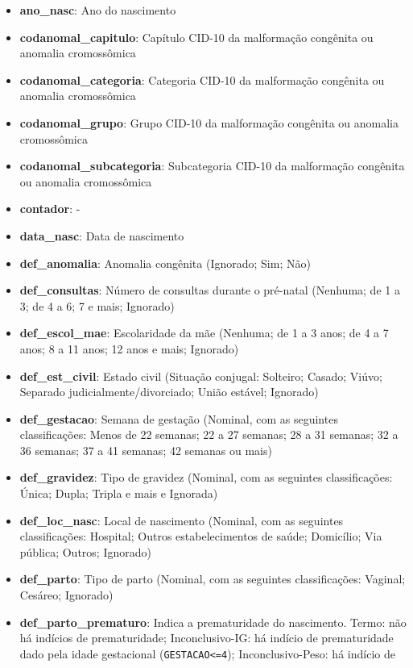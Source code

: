 \documentclass[
]{article}
\providecommand{\tightlist}{%
  \setlength{\itemsep}{0pt}\setlength{\parskip}{0pt}}
\begin{document}
\begin{itemize}
\tightlist
\item
  \textbf{ano\_nasc}: Ano do nascimento
\item
  \textbf{codanomal\_capitulo}: Capítulo CID-10 da malformação congênita
  ou anomalia cromossômica
\item
  \textbf{codanomal\_categoria}: Categoria CID-10 da malformação
  congênita ou anomalia cromossômica
\item
  \textbf{codanomal\_grupo}: Grupo CID-10 da malformação congênita ou
  anomalia cromossômica
\item
  \textbf{codanomal\_subcategoria}: Subcategoria CID-10 da malformação
  congênita ou anomalia cromossômica
\item
  \textbf{contador}: -
\item
  \textbf{data\_nasc}: Data de nascimento
\item
  \textbf{def\_anomalia}: Anomalia congênita (Ignorado; Sim; Não)
\item
  \textbf{def\_consultas}: Número de consultas durante o pré-natal
  (Nenhuma; de 1 a 3; de 4 a 6; 7 e mais; Ignorado)
\item
  \textbf{def\_escol\_mae}: Escolaridade da mãe (Nenhuma; de 1 a 3 anos;
  de 4 a 7 anos; 8 a 11 anos; 12 anos e mais; Ignorado)
\item
  \textbf{def\_est\_civil}: Estado civil (Situação conjugal: Solteiro;
  Casado; Viúvo; Separado judicialmente/divorciado; União estável;
  Ignorado)
\item
  \textbf{def\_gestacao}: Semana de gestação (Nominal, com as seguintes
  classificações: Menos de 22 semanas; 22 a 27 semanas; 28 a 31 semanas;
  32 a 36 semanas; 37 a 41 semanas; 42 semanas ou mais)
\item
  \textbf{def\_gravidez}: Tipo de gravidez (Nominal, com as seguintes
  classificações: Única; Dupla; Tripla e mais e Ignorada)
\item
  \textbf{def\_loc\_nasc}: Local de nascimento (Nominal, com as
  seguintes classificações: Hospital; Outros estabelecimentos de saúde;
  Domicílio; Via pública; Outros; Ignorado)
\item
  \textbf{def\_parto}: Tipo de parto (Nominal, com as seguintes
  classificações: Vaginal; Cesáreo; Ignorado)
\item
  \textbf{def\_parto\_prematuro}: Indica a prematuridade do nascimento.
  Termo: não há indícios de prematuridade; Inconclusivo-IG: há indício
  de prematuridade dado pela idade gestacional
  (\texttt{GESTACAO\textless{}=4}); Inconclusivo-Peso: há indício de

\end{itemize}
\end{document}
